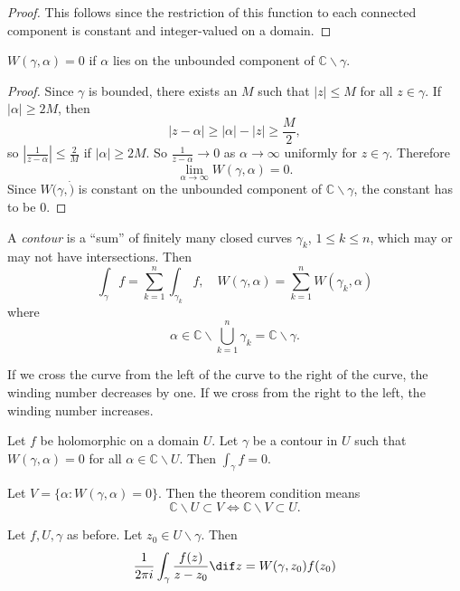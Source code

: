 \begin{proof}
This follows since the restriction of this function to each connected
component is constant and integer-valued on a domain.
\end{proof}

\begin{lemma}
$W(\gamma, \alpha) = 0$ if $\alpha$ lies on the unbounded component of
$\mathbb{C} \backslash \gamma$.
\end{lemma}

\begin{proof}
Since $\gamma$ is bounded, there exists an $M$ such that $|z| \leq M$ for all
$z \in \gamma$. If $|\alpha| \geq 2 M$, then
$$
|z - \alpha| \geq |\alpha| - |z| \geq \frac{M}{2},
$$
so $\left|\frac{1}{z - \alpha}\right| \leq \frac{2}{M}$ if
$|\alpha| \geq 2 M$. So $\frac{1}{z - \alpha} \to 0$ as
$\alpha \to \infty$ uniformly for $z \in \gamma$. Therefore
$$
\lim_{\alpha \to \infty} W(\gamma, \alpha) = 0.
$$
Since $W(\gamma, \dot)$ is constant on the unbounded component
of $\mathbb{C} \backslash \gamma$, the constant has to be 0.
\end{proof}

\begin{defn}[Contour]
A \emph{contour} is a ``sum'' of finitely many closed curves
$\gamma_k$, $1 \leq k \leq n$, which may or may not have intersections.
Then
$$
\int_\gamma f = \sum_{k=1}^n \int_{\gamma_k} f, \quad
W(\gamma, \alpha) = \sum_{k=1}^n W(\gamma_k, \alpha)
$$
where
$$
\alpha \in \mathbb{C} \backslash \bigcup_{k=1}^n \gamma_k
       =   \mathbb{C} \backslash \gamma.
$$
\end{defn}

If we cross the curve from the left of the curve to the right
of the curve, the winding number decreases by one. If we cross
from the right to the left, the winding number increases.

\begin{theorem}
Let $f$ be holomorphic on a domain $U$. Let $\gamma$ be a
contour in $U$ such that $W(\gamma, \alpha) = 0$ for all
$\alpha \in \mathbb{C} \backslash U$. Then $\int_\gamma f = 0$.
\end{theorem}

\begin{xmpl}
Let $V = \{ \alpha : W(\gamma, \alpha) = 0 \}$. Then the theorem
condition means
$$
\mathbb{C} \backslash U \subset V
\iff
\mathbb{C} \backslash V \subset U.
$$
\end{xmpl}

\begin{theorem}
Let $f, U, \gamma$ as before. Let $z_0 \in U \backslash \gamma$. Then
$$
  \frac{1}{2 \pi i}
  \int_\gamma
    \frac{f(z)}
         {z - z_0}
    \dif z
= W(\gamma, z_0) f(z_0)
$$
\end{theorem}
